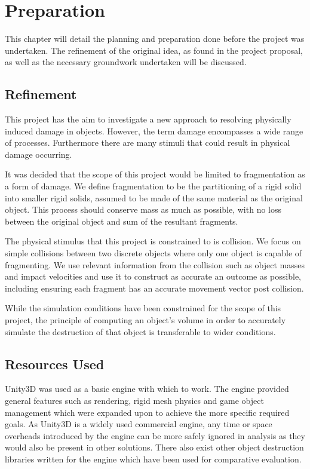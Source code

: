 \chapter{Preparation}

This chapter will detail the planning and preparation done before the project was undertaken. The refinement of the original idea, as found in the project proposal, as well as the necessary groundwork undertaken will be discussed.

\section{Refinement}

This project has the aim to investigate a new approach to resolving physically induced damage in objects. However, the term damage encompasses a wide range of processes. Furthermore there are many stimuli that could result in physical damage occurring.

It was decided that the scope of this project would be limited to fragmentation as a form of damage. We define fragmentation to be the partitioning of a rigid solid into smaller rigid solids, assumed to be made of the same material as the original object. This process should conserve mass as much as possible, with no loss between the original object and sum of the resultant fragments. 

The physical stimulus that this project is constrained to is collision. We focus on simple collisions between two discrete objects where only one object is capable of fragmenting. We use relevant information from the collision such as object masses and impact velocities and use it to construct as accurate an outcome as possible, including ensuring each fragment has an accurate movement vector post collision.

While the simulation conditions have been constrained for the scope of this project, the principle of computing an object's volume in order to accurately simulate the destruction of that object is transferable to wider conditions.

\section{Resources Used}

Unity3D was used as a basic engine with which to work. The engine provided general features such as rendering, rigid mesh physics and game object management which were expanded upon to achieve the more specific required goals. As Unity3D is a widely used commercial engine, any time or space overheads introduced by the engine can be more safely ignored in analysis as they would also be present in other solutions. There also exist other object destruction libraries written for the engine which have been used for comparative evaluation\cite{Meshinator}.

